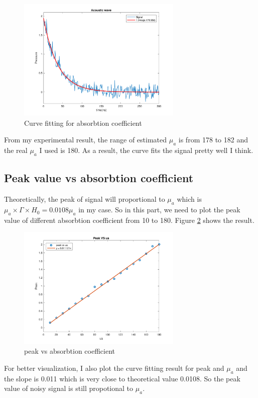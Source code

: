 \documentclass{article}
\begin{document}
\begin{figure}[H]
    \centering
    \includegraphics[width=0.7\textwidth]{src/p1c.pdf}
    \caption{Curve fitting for absorbtion coefficient}
    \label{fig:p1c}
\end{figure}

From my experimental result, the range of estimated $\mu_a$ is from 178 to 182 and the real $\mu_a$ I used is 180. 
As a result, the curve fits the signal pretty well I think.


\subsection{Peak value vs absorbtion coefficient}
\label{sec:p1d}
Theoretically, the peak of signal will proportional to $\mu_a$ which is $\mu_a \times \Gamma \times H_0 = 0.0108\mu_a$ in my case. 
So in this part, we need to plot the peak value of different absorbtion coefficient from 10 to 180. Figure \ref{fig:p1d} 
shows the result.
\begin{figure}[H]
    \centering
    \includegraphics[width=0.7\textwidth]{src/p1d.pdf}
    \caption{peak vs absorbtion coefficient}
    \label{fig:p1d}
\end{figure}
For better visualization, I also plot the curve fitting result for peak and $\mu_a$ and the slope is 0.011 which is very close to
theoretical value 0.0108. So the peak value of noisy signal is still propotional to $\mu_a$.
\end{document}
